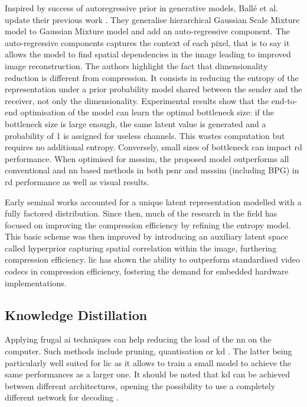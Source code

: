 \documentclass{article}
\begin{document}
Inspired by success of autoregressive prior in generative models, Ballé et al. update their previous work \cite{minnen2018jointautoregressivehierarchicalpriors}. They generalise hierarchical Gaussian Scale Mixture model to Gaussian Mixture model and add an auto-regressive component. The auto-regressive components captures the context of each pixel, that is to say it allows the model to find spatial dependencies in the image leading to improved image reconstruction. The authors highlight the fact that dimensionality reduction is different from compression. It consists in reducing the entropy of the representation under a prior probability model shared between the sender and the receiver, not only the dimensionality. Experimental results show that the end-to-end optimisation of the model can learn the optimal bottleneck size: if the bottleneck size is large enough, the same latent value is generated and a probability of 1 is assigned for useless channels. This wastes computation but requires no additional entropy. Conversely, small sizes of bottleneck can impact \acrshort{rd} performance. When optimised for \acrshort{msssim}, the proposed model outperforms all conventional and \acrshort{nn} based methods in both \acrshort{psnr} and \acrshort{msssim} (including BPG) in \acrshort{rd} performance as well as visual results.

Early seminal works accounted for a unique latent representation modelled with a fully factored distribution. Since then, much of the research in the field has focused on improving the compression efficiency by refining the entropy model. This basic scheme was then improved by introducing an auxiliary latent space called hyperprior capturing spatial correlation within the image, furthering compression efficiency. \acrshort{lic} has shown the ability to outperform standardised video codecs in compression efficiency, fostering the demand for embedded hardware implementations.

\subsection{Knowledge Distillation}
Applying frugal \acrshort{ai} techniques can help reducing the load of the \acrshort{nn} on the computer. Such methods include pruning, quantisation or \acrfull{kd} \cite{touvron2021trainingdataefficientimagetransformers}. The latter being particularly well suited for \acrshort{lic} as it allows to train a small model to achieve the same performances as a larger one. It should be noted that \acrshort{kd} can be achieved between different architectures, opening the possibility to use a completely different network for decoding \cite{liu2022crossarchitectureknowledgedistillation}.
\end{document}
